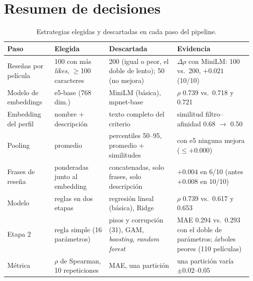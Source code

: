 \documentclass[11pt,a4paper]{article}
\begin{document}
\section{Resumen de decisiones}

\begin{table}[H]
\centering\footnotesize\renewcommand{\arraystretch}{1.3}
\begin{tabularx}{\linewidth}{@{}>{\raggedright}p{2.3cm}>{\raggedright}p{3.6cm}>{\raggedright}p{3.9cm}>{\raggedright\arraybackslash}X@{}}
\toprule
Paso & Elegida & Descartada & Evidencia \\ \midrule
Reseñas por película & 100 con más \emph{likes}, $\geq$100 caracteres & 200 (igual o peor, el doble de lento); 50 (no mejora) & $\Delta\rho$ con MiniLM: 100 vs.\ 200, $+0.021$ (10/10) \\
Modelo de embeddings & e5-base (768 dim.) & MiniLM (básica), mpnet-base & $\rho$ 0.739 vs.\ 0.718 y 0.721 \\
Embedding del perfil & nombre + descripción & texto completo del criterio & similitud filtro--afinidad 0.68 $\rightarrow$ 0.50 \\
Pooling & promedio & percentiles 50--95, promedio + similitudes & con e5 ninguna mejora ($\leq +0.000$) \\
Frases de reseña & ponderadas junto al embedding & concatenadas, solo frases, solo descripción & $+0.004$ en 6/10 (antes $+0.008$ en 10/10) \\
Modelo & reglas en dos etapas & regresión lineal (básica), Ridge & $\rho$ 0.739 vs.\ 0.617 y 0.653 \\
Etapa 2 & regla simple (16 parámetros) & pisos y corrupción (31), GAM, \emph{boosting}, \emph{random forest} & MAE 0.294 vs.\ 0.293 con el doble de parámetros; árboles peores (110 películas) \\
Métrica & $\rho$ de Spearman, 10 repeticiones & MAE, una partición & una partición varía $\pm0.02$--$0.05$ \\
\bottomrule
\end{tabularx}
\caption{Estrategias elegidas y descartadas en cada paso del pipeline.}
\end{table}
\end{document}

